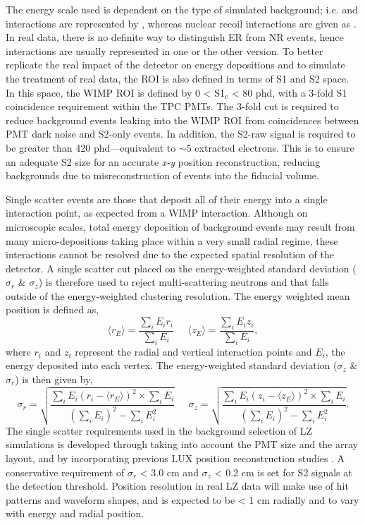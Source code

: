 The energy scale used is dependent on the type of simulated background; i.e. \beta and \gamma interactions are represented by \kevee{}, whereas nuclear recoil interactions are given as \kevnr{}. In real data, there is no definite way to distinguish ER from NR events, hence interactions are usually represented in one or the other version. To better replicate the real impact of the detector on energy depositions and to simulate the treatment of real data, the ROI is also defined in terms of S1 and S2 space. In this space, the WIMP ROI is defined by 0 < S1$_{c}$ < 80 phd, with a 3-fold S1 coincidence requirement within the TPC PMTs. The 3-fold cut is required to reduce background events leaking into the WIMP ROI from coincidences between PMT dark noise and S2-only events. In addition, the S2-raw signal is required to be greater than 420 phd---equivalent to $\sim5$ extracted electrons. This is to ensure an adequate S2 size for an accurate \textit{x-y} position reconstruction, reducing backgrounds due to misreconstruction of events into the fiducial volume.

Single scatter events are those that deposit all of their energy into a single interaction point, as expected from a WIMP interaction. Although on microscopic scales, total energy deposition of background events may result from many micro-depositions taking place within a very small radial regime, these interactions cannot be resolved due to the expected spatial resolution of the detector. A single scatter cut placed on the energy-weighted standard deviation ($\sigma_{r}$ \& $\sigma_{z}$) is therefore used to reject multi-scattering neutrons and \grays{} that falls outside of the energy-weighted clustering resolution. The energy weighted mean position is defined as, 
%
\begin{equation}
    \big\langle r_{E} \big\rangle = \frac{\sum_{i}E_{i}r_{i}}{\sum_{i}E_{i}} \;\;\;\;\; \big\langle z_{E} \big\rangle = \frac{\sum_{i}E_{i}z_{i}}{\sum_{i}E_{i}},
    \label{eq:weighted_mean_position}
\end{equation}
%
where $r_{i}$ and $z_{i}$ represent the radial and vertical interaction points and $E_{i}$, the energy deposited into each vertex. The energy-weighted standard deviation ($\sigma_{z}$ \& $\sigma_{r}$) is then given by,
%
\begin{equation}
    \sigma_{r} = \sqrt{\frac{\sum_{i}E_{i}(r_{i} - \big\langle r_{E} \big\rangle)^{2} \times \sum_{i}E_{i}}{(\sum_{i}E_{i})^{2} - \sum_{i}E_{i}^{2}}} \;\;\;\;\; \sigma_{z} = \sqrt{\frac{\sum_{i}E_{i}(z_{i} - \big\langle z_{E} \big\rangle)^{2} \times \sum_{i}E_{i}}{(\sum_{i}E_{i})^{2} - \sum_{i}E_{i}^{2}}}.
    \label{eq:energy_weighted_sd}
\end{equation}
%
The single scatter requirements used in the background selection of LZ simulations is developed through taking into account the PMT size and the array layout, and by incorporating previous LUX position reconstruction studies \cite{Akerib_2018_lux_position}. A conservative requirement of $\sigma_{r}$ < 3.0 cm and $\sigma_{z}$ < 0.2 cm is set for S2 signals at the detection threshold. Position resolution in real LZ data will make use of hit patterns and waveform shapes, and is expected to be < 1 cm radially and to vary with energy and radial position. 

